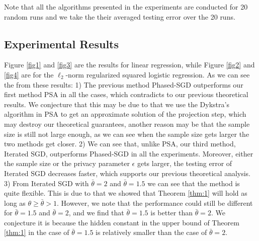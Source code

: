 \documentclass[12pt]{alt2022} %
\begin{document}
Note that all the algorithms presented in the experiments are conducted for 20 random runs and we take the their averaged testing error over the 20 runs. 
  \begin{figure*}[!htbp]
\centering
{}
\quad
{}
\quad
{}
\quad
{}

\caption{ Results of $l_2$ regularized squared logistic regression problem (\ref{eq24}) with  different training sample size. \label{fig2}}
\end{figure*}

 \begin{figure*}[!htbp]
\centering
{}
\quad
{}
\quad
{}
\quad
{}
\caption{ Results of Linear regression problem (\ref{eq23}) with  different privacy budget $\epsilon$. }
\label{fig3}
\end{figure*}
\subsection*{Experimental Results}
Figure \ref{fig1} and \ref{fig3} are the results for linear regression, while Figure \ref{fig2} and \ref{fig4} are for the $\ell_2$-norm regularized squared logistic regression. As we can see the from these results: 1) The previous method Phased-SGD outperforms our first method PSA in all the cases, which contradicts to our previous theoretical results. We conjecture that this may be due to that we use the Dykstra’s algorithm in PSA to get an approximate solution of the projection step, which may destroy our theoretical guarantees, another reason may be that the sample size is still not large enough, as we can see when the sample size gets larger the two methods get closer. 2) We can see that, unlike PSA, our third method, Iterated SGD, outperforms Phased-SGD in all the experiments. Moreover, either the sample size or the privacy parameter $\epsilon$ gets larger, the testing error of Iterated SGD decreases faster, which supports our previous theoretical analysis. 3) From Iterated SGD with $\bar{\theta}=2$ and $\bar{\theta}=1.5$ we can see that the method is quite flexible. This is due to that we showed that Theorem \ref{thm:1} will hold as long as  $\theta\geq \bar{\theta}>1$.  However, we note that the performance could still be different for $\bar{\theta}=1.5$ and $\bar{\theta}=2$, and we find that $\bar{\theta}=1.5$ is better than $\bar{\theta}=2$. We conjecture it is because  the hidden constant in the upper bound of Theorem \ref{thm:1} in the case of  $\bar{\theta}=1.5$ is relatively smaller than  the case of  $\bar{\theta}=2$.
\end{document}
